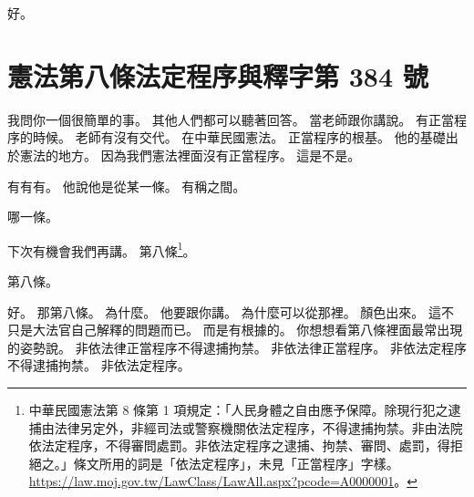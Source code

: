 \hypertarget{c01:cue:2535}{}好。

\section{憲法第八條法定程序與釋字第 384 號}

\hypertarget{c01:cue:2536}{}我問你一個很簡單的事。
\hypertarget{c01:cue:2537}{}其他人們都可以聽著回答。
\hypertarget{c01:cue:2538}{}當老師跟你講說。
\hypertarget{c01:cue:2539}{}有正當程序的時候。
\hypertarget{c01:cue:2540}{}老師有沒有交代。
\hypertarget{c01:cue:2541}{}在中華民國憲法。
\hypertarget{c01:cue:2542}{}正當程序的根基。
\hypertarget{c01:cue:2543}{}他的基礎出於憲法的地方。
\hypertarget{c01:cue:2544}{}因為我們憲法裡面沒有正當程序。
\hypertarget{c01:cue:2545}{}這是不是。

\hypertarget{c01:cue:2546}{}有有有。
\hypertarget{c01:cue:2547}{}他說他是從某一條。
\hypertarget{c01:cue:2548}{}有稱之間。

\hypertarget{c01:cue:2549}{}哪一條。

\hypertarget{c01:cue:2550}{}下次有機會我們再講。
\hypertarget{c01:cue:2551}{}第八條\footnote{中華民國憲法第 8 條第 1 項規定：「人民身體之自由應予保障。除現行犯之逮捕由法律另定外，非經司法或警察機關依法定程序，不得逮捕拘禁。非由法院依法定程序，不得審問處罰。非依法定程序之逮捕、拘禁、審問、處罰，得拒絕之。」條文所用的詞是「依法定程序」，未見「正當程序」字樣。\url{https://law.moj.gov.tw/LawClass/LawAll.aspx?pcode=A0000001}。}。

\hypertarget{c01:cue:2552}{}第八條。

\hypertarget{c01:cue:2553}{}好。
\hypertarget{c01:cue:2554}{}那第八條。
\hypertarget{c01:cue:2555}{}為什麼。
\hypertarget{c01:cue:2556}{}他要跟你講。
\hypertarget{c01:cue:2557}{}為什麼可以從那裡。
\hypertarget{c01:cue:2558}{}顏色出來。
\hypertarget{c01:cue:2559}{}這不只是大法官自己解釋的問題而已。
\hypertarget{c01:cue:2560}{}而是有根據的。
\hypertarget{c01:cue:2561}{}你想想看第八條裡面最常出現的姿勢說。
\hypertarget{c01:cue:2562}{}非依法律正當程序不得逮捕拘禁。
\hypertarget{c01:cue:2563}{}非依法律正當程序。
\hypertarget{c01:cue:2564}{}非依法定程序不得逮捕拘禁。
\hypertarget{c01:cue:2565}{}非依法定程序。

